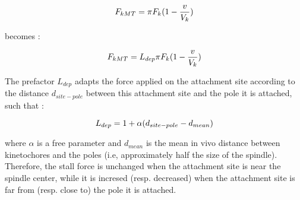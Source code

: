 \documentclass[a4paper,12pt]{article}
\begin{document}
\begin{equation}
F_{kMT}= \pi F_k (1 - \frac{v}{V_k})\\
\end{equation}

becomes :

\begin{equation}
F_{kMT}= L_{dep} \pi F_k (1 - \frac{v}{V_k})\\
\end{equation}

The prefactor $L_{dep}$ adapts the force applied on the attachment site according to the distance $d_{site-pole}$ between this attachment site and the pole it is attached, such that :

\begin{equation}
L_{dep} = 1 + \alpha(d_{site-pole} - d_{mean})\\
\end{equation}

where $\alpha$ is a free parameter and $d_{mean}$ is the mean in vivo distance between kinetochores and the poles (i.e, approximately half the size of the spindle). Therefore, the stall force is unchanged when the attachment site is near the spindle center, while it is incresed (resp. decreased) when the attachment site is far from (resp. close to) the pole it is attached.
\end{document}
